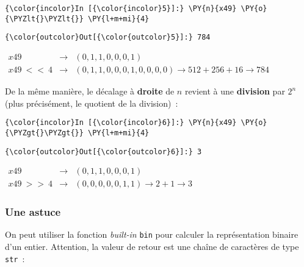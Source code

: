     \begin{Verbatim}[commandchars=\\\{\},frame=single,framerule=0.3mm,rulecolor=\color{cellframecolor}]
{\color{incolor}In [{\color{incolor}5}]:} \PY{n}{x49} \PY{o}{\PYZlt{}\PYZlt{}} \PY{l+m+mi}{4}
\end{Verbatim}


\begin{Verbatim}[commandchars=\\\{\},frame=single,framerule=0.3mm,rulecolor=\color{cellframecolor}]
{\color{outcolor}Out[{\color{outcolor}5}]:} 784
\end{Verbatim}
            
    \(\begin{array}{rcl} x49 & \rightarrow & (0,1,1,0,0,0,1) \\ x49\ <<\ 4 & \rightarrow & (0,1,1,0,0,0,1,0,0,0,0) \rightarrow 512 + 256 + 16 \rightarrow 784 \end{array}\)

    De la même manière, le décalage à \textbf{droite} de \(n\) revient à une
\textbf{division} par \(2^n\) (plus précisément, le quotient de la
division)~:

    \begin{Verbatim}[commandchars=\\\{\},frame=single,framerule=0.3mm,rulecolor=\color{cellframecolor}]
{\color{incolor}In [{\color{incolor}6}]:} \PY{n}{x49} \PY{o}{\PYZgt{}\PYZgt{}} \PY{l+m+mi}{4}
\end{Verbatim}


\begin{Verbatim}[commandchars=\\\{\},frame=single,framerule=0.3mm,rulecolor=\color{cellframecolor}]
{\color{outcolor}Out[{\color{outcolor}6}]:} 3
\end{Verbatim}
            
    \(\begin{array}{rcl} x49 & \rightarrow & (0,1,1,0,0,0,1) \\ x49\ >>\ 4 & \rightarrow & (0,0,0,0,0,1,1) \rightarrow 2 + 1 \rightarrow 3 \end{array}\)

    \hypertarget{une-astuce}{%
\subsubsection{Une astuce}\label{une-astuce}}

    On peut utiliser la fonction \emph{built-in} \texttt{bin} pour calculer
la représentation binaire d'un entier. Attention, la valeur de retour
est une chaîne de caractères de type \texttt{str}~:


